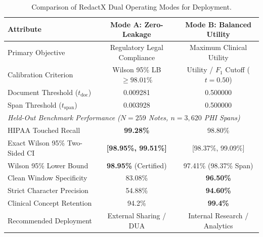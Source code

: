 \begin{table}[h]
\centering
\small
\caption{Comparison of RedactX Dual Operating Modes for Deployment.}
\label{tab:dual_modes}
\begin{tabular}{l cc}
\toprule
\textbf{Attribute} & \textbf{Mode A: Zero-Leakage} & \textbf{Mode B: Balanced Utility} \\
\midrule
Primary Objective & Regulatory Legal Compliance & Maximum Clinical Utility \\
Calibration Criterion & Wilson 95\% LB $\ge 98.01\%$ & Utility / $F_1$ Cutoff ($t=0.50$) \\
Document Threshold ($t_{\text{doc}}$) & 0.009281 & 0.500000 \\
Span Threshold ($t_{\text{span}}$) & 0.003928 & 0.500000 \\
\midrule
\multicolumn{3}{l}{\textit{Held-Out Benchmark Performance ($N=259$ Notes, $n=3,620$ PHI Spans)}} \\[2pt]
HIPAA Touched Recall & \textbf{99.28\%} & 98.80\% \\
Exact Wilson 95\% Two-Sided CI & \textbf{[98.95\%, 99.51\%]} & [98.37\%, 99.09\%] \\
Wilson 95\% Lower Bound & \textbf{98.95\%} (Certified) & 97.41\% (98.37\% Span) \\
Clean Window Specificity & 83.08\% & \textbf{96.50\%} \\
Strict Character Precision & 54.88\% & \textbf{94.60\%} \\
Clinical Concept Retention & 94.2\% & \textbf{99.4\%} \\
\midrule
Recommended Deployment & External Sharing / DUA & Internal Research / Analytics \\
\bottomrule
\end{tabular}
\end{table}
